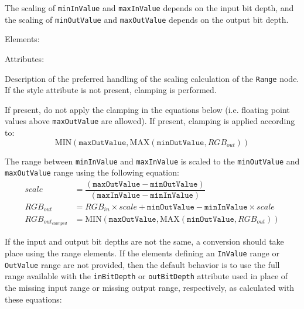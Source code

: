 The scaling of \texttt{minInValue} and \texttt{maxInValue} depends on the input bit depth, and the scaling of \texttt{minOutValue} and \texttt{maxOutValue} depends on the output bit depth.

Elements:
\begin{xmlfields}
	\xmlitemopt[minInValue][optional]
	\xmlitemopt[maxInValue][optional]
	\xmlitemopt[minOutValue][optional]
	\xmlitemopt[maxOutValue][optional]
\end{xmlfields}

Attributes:
\begin{xmlfields}
	\xmlitem[style][optional]
		Description of the preferred handling of the scaling calculation of the \texttt{Range} node. If the style attribute is not present, clamping is performed.
		\begin{xmlfields}
			\xmlitemd[``noClamp''] If present, do not apply the clamping in the equations below (i.e. floating point values above \texttt{maxOutValue} are allowed). 
			\xmlitemd[``Clamp''] If present, clamping is applied according to:
				\begin{equation}
					\mathrm{MIN}(\texttt{maxOutValue}, \mathrm{MAX}( \texttt{minOutValue}, RGB_{out} ))
				\end{equation}
		\end{xmlfields}
\end{xmlfields}

The range between \texttt{minInValue} and \texttt{maxInValue} is scaled to the \texttt{minOutValue} and \texttt{maxOutValue} range using the following equation:
\begin{align*}
	scale &= \dfrac{(\texttt{maxOutValue} - \texttt{minOutValue})}{(\texttt{maxInValue} - \texttt{minInValue})} \\
	RGB_{out} &= RGB_{in} \times scale + \texttt{minOutValue} - \texttt{minInValue} \times scale \\
	RGB_{out_{clamped}} &= \mathrm{MIN}(\texttt{maxOutValue}, \mathrm{MAX}( \texttt{minOutValue}, RGB_{out}))
\end{align*}

If the input and output bit depths are not the same, a conversion should take place using the range elements. If the elements defining an \texttt{InValue} range or \texttt{OutValue} range are not provided, then the default behavior is to use the full range available with the \texttt{inBitDepth} or \texttt{outBitDepth} attribute used in place of the missing input range or missing output range, respectively, as calculated with these equations:

